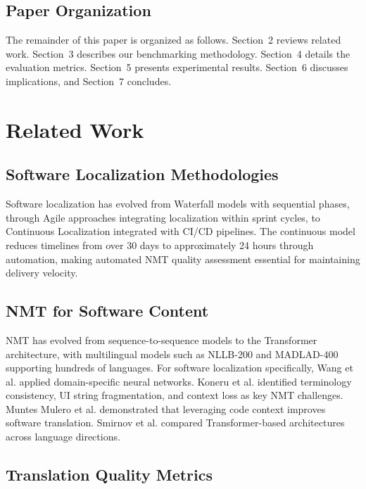 \documentclass[Afour,sagev,times,doublespace]{sagej}
\begin{document}
\subsection{Paper Organization}

The remainder of this paper is organized as follows. Section~2 reviews related work. Section~3 describes our benchmarking methodology. Section~4 details the evaluation metrics. Section~5 presents experimental results. Section~6 discusses implications, and Section~7 concludes.

\section{Related Work}

\subsection{Software Localization Methodologies}

Software localization has evolved from Waterfall models with sequential phases,\cite{8,9} through Agile approaches integrating localization within sprint cycles,\cite{10,11} to Continuous Localization integrated with CI/CD pipelines.\cite{12,13} The continuous model reduces timelines from over 30 days to approximately 24 hours through automation,\cite{14,15} making automated NMT quality assessment essential for maintaining delivery velocity.

\subsection{NMT for Software Content}

NMT has evolved from sequence-to-sequence models to the Transformer architecture,\cite{5} with multilingual models such as NLLB-200 and MADLAD-400 supporting hundreds of languages.\cite{16} For software localization specifically, Wang et al.\cite{17} applied domain-specific neural networks. Koneru et al.\cite{6} identified terminology consistency, UI string fragmentation, and context loss as key NMT challenges. Muntes Mulero et al.\cite{7} demonstrated that leveraging code context improves software translation. Smirnov et al.\cite{18} compared Transformer-based architectures across language directions.

\subsection{Translation Quality Metrics}
\end{document}
